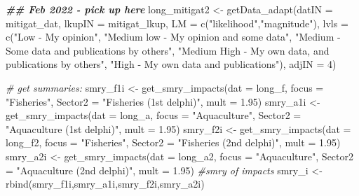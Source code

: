 \documentclass[
]{article}
\newenvironment{Shaded}{\begin{snugshade}}{\end{snugshade}}
\newcommand{\AttributeTok}[1]{\textcolor[rgb]{0.77,0.63,0.00}{#1}}
\newcommand{\CommentTok}[1]{\textcolor[rgb]{0.56,0.35,0.01}{\textit{#1}}}
\newcommand{\DecValTok}[1]{\textcolor[rgb]{0.00,0.00,0.81}{#1}}
\newcommand{\DocumentationTok}[1]{\textcolor[rgb]{0.56,0.35,0.01}{\textbf{\textit{#1}}}}
\newcommand{\FloatTok}[1]{\textcolor[rgb]{0.00,0.00,0.81}{#1}}
\newcommand{\FunctionTok}[1]{\textcolor[rgb]{0.00,0.00,0.00}{#1}}
\newcommand{\NormalTok}[1]{#1}
\newcommand{\OtherTok}[1]{\textcolor[rgb]{0.56,0.35,0.01}{#1}}
\newcommand{\StringTok}[1]{\textcolor[rgb]{0.31,0.60,0.02}{#1}}
\begin{document}
\begin{Shaded}
\begin{Highlighting}[]
    \DocumentationTok{\#\# Feb 2022 {-} pick up here}
\NormalTok{    long\_mitigat2     }\OtherTok{\textless{}{-}} \FunctionTok{getData\_adapt}\NormalTok{(}\AttributeTok{datIN  =}\NormalTok{ mitigat\_dat,}
                                       \AttributeTok{lkupIN =}\NormalTok{ mitigat\_lkup,}
                                       \AttributeTok{LM  =} \FunctionTok{c}\NormalTok{(}\StringTok{"likelihood"}\NormalTok{,}\StringTok{"magnitude"}\NormalTok{),}
                                       \AttributeTok{lvls  =} \FunctionTok{c}\NormalTok{(}\StringTok{"Low  {-} My opinion"}\NormalTok{,}
                                                  \StringTok{"Medium low {-} My opinion and some data"}\NormalTok{,}
                                                  \StringTok{"Medium {-} Some data and publications by others"}\NormalTok{,}
                                                  \StringTok{"Medium High {-} My own data, and publications by others"}\NormalTok{,}
                                                  \StringTok{"High {-} My own data and publications"}\NormalTok{),}
                                       \AttributeTok{adjIN =} \DecValTok{4}\NormalTok{)}
    
    \CommentTok{\# get summaries:}
\NormalTok{    smry\_f1i }\OtherTok{\textless{}{-}} \FunctionTok{get\_smry\_impacts}\NormalTok{(}\AttributeTok{dat =}\NormalTok{ long\_f,}
                                 \AttributeTok{focus   =} \StringTok{"Fisheries"}\NormalTok{,}
                                 \AttributeTok{Sector2 =} \StringTok{"Fisheries (1st delphi)"}\NormalTok{, }\AttributeTok{mult =} \FloatTok{1.95}\NormalTok{)}
\NormalTok{    smry\_a1i }\OtherTok{\textless{}{-}} \FunctionTok{get\_smry\_impacts}\NormalTok{(}\AttributeTok{dat =}\NormalTok{ long\_a,}
                                 \AttributeTok{focus   =} \StringTok{"Aquaculture"}\NormalTok{,}
                                 \AttributeTok{Sector2 =} \StringTok{"Aquaculture (1st delphi)"}\NormalTok{, }\AttributeTok{mult =} \FloatTok{1.95}\NormalTok{)}
\NormalTok{    smry\_f2i }\OtherTok{\textless{}{-}} \FunctionTok{get\_smry\_impacts}\NormalTok{(}\AttributeTok{dat =}\NormalTok{ long\_f2,}
                                 \AttributeTok{focus   =} \StringTok{"Fisheries"}\NormalTok{,}
                                 \AttributeTok{Sector2 =} \StringTok{"Fisheries (2nd delphi)"}\NormalTok{, }\AttributeTok{mult =} \FloatTok{1.95}\NormalTok{)}
\NormalTok{    smry\_a2i }\OtherTok{\textless{}{-}} \FunctionTok{get\_smry\_impacts}\NormalTok{(}\AttributeTok{dat =}\NormalTok{ long\_a2,}
                                 \AttributeTok{focus   =} \StringTok{"Aquaculture"}\NormalTok{,}
                                 \AttributeTok{Sector2 =} \StringTok{"Aquaculture (2nd delphi)"}\NormalTok{, }\AttributeTok{mult =} \FloatTok{1.95}\NormalTok{)}
    \CommentTok{\#smry of impacts}
\NormalTok{    smry\_i }\OtherTok{\textless{}{-}} \FunctionTok{rbind}\NormalTok{(smry\_f1i,smry\_a1i,smry\_f2i,smry\_a2i)}
   

\end{Highlighting}
\end{Shaded}
\end{document}
